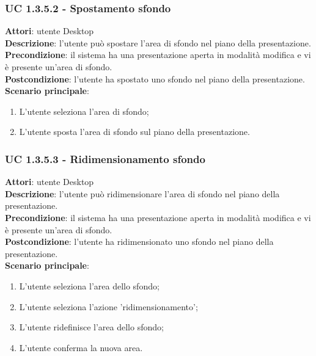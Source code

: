 \subsubsection{UC 1.3.5.2 - Spostamento sfondo}{
	\label{uc1.3.5.2}
	\textbf{Attori}: utente Desktop \\
	\textbf{Descrizione}: l'utente può spostare l'area di sfondo nel piano della presentazione. \\
	\textbf{Precondizione}: il sistema ha una presentazione aperta in modalità modifica e vi è presente un'area di sfondo.	\\
	\textbf{Postcondizione}: l'utente ha spostato uno sfondo nel piano della presentazione.	\\
	\textbf{Scenario principale}:
	\begin{enumerate}
		\item L'utente seleziona l'area di sfondo;
		\item L'utente sposta l'area di sfondo sul piano della presentazione.
	\end{enumerate}
}
\subsubsection{UC 1.3.5.3 - Ridimensionamento sfondo}{
	\label{uc1.3.5.3}
	\textbf{Attori}: utente Desktop \\
	\textbf{Descrizione}: l'utente può ridimensionare l'area di sfondo nel piano della presentazione. \\
	\textbf{Precondizione}: il sistema ha una presentazione aperta in modalità modifica e vi è presente un'area di sfondo.	\\
	\textbf{Postcondizione}: l'utente ha ridimensionato uno sfondo nel piano della presentazione.	\\
	\textbf{Scenario principale}:
	\begin{enumerate}
		\item L'utente seleziona l'area dello sfondo;
		\item L'utente seleziona l'azione 'ridimensionamento';
		\item L'utente ridefinisce l'area dello sfondo;
		\item L'utente conferma la nuova area.
	\end{enumerate}
}
